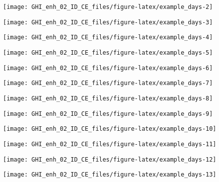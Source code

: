 \documentclass[
  10pt,
  a4paper,oneside]{article}
\begin{document}
\begin{center}\texttt{[image: GHI\_enh\_02\_ID\_CE\_files/figure-latex/example\_days-2]} \end{center}

\begin{center}\texttt{[image: GHI\_enh\_02\_ID\_CE\_files/figure-latex/example\_days-3]} \end{center}

\begin{center}\texttt{[image: GHI\_enh\_02\_ID\_CE\_files/figure-latex/example\_days-4]} \end{center}

\begin{center}\texttt{[image: GHI\_enh\_02\_ID\_CE\_files/figure-latex/example\_days-5]} \end{center}

\begin{center}\texttt{[image: GHI\_enh\_02\_ID\_CE\_files/figure-latex/example\_days-6]} \end{center}

\begin{center}\texttt{[image: GHI\_enh\_02\_ID\_CE\_files/figure-latex/example\_days-7]} \end{center}

\begin{center}\texttt{[image: GHI\_enh\_02\_ID\_CE\_files/figure-latex/example\_days-8]} \end{center}

\begin{center}\texttt{[image: GHI\_enh\_02\_ID\_CE\_files/figure-latex/example\_days-9]} \end{center}

\begin{center}\texttt{[image: GHI\_enh\_02\_ID\_CE\_files/figure-latex/example\_days-10]} \end{center}

\begin{center}\texttt{[image: GHI\_enh\_02\_ID\_CE\_files/figure-latex/example\_days-11]} \end{center}

\begin{center}\texttt{[image: GHI\_enh\_02\_ID\_CE\_files/figure-latex/example\_days-12]} \end{center}

\begin{center}\texttt{[image: GHI\_enh\_02\_ID\_CE\_files/figure-latex/example\_days-13]} \end{center}
\end{document}
